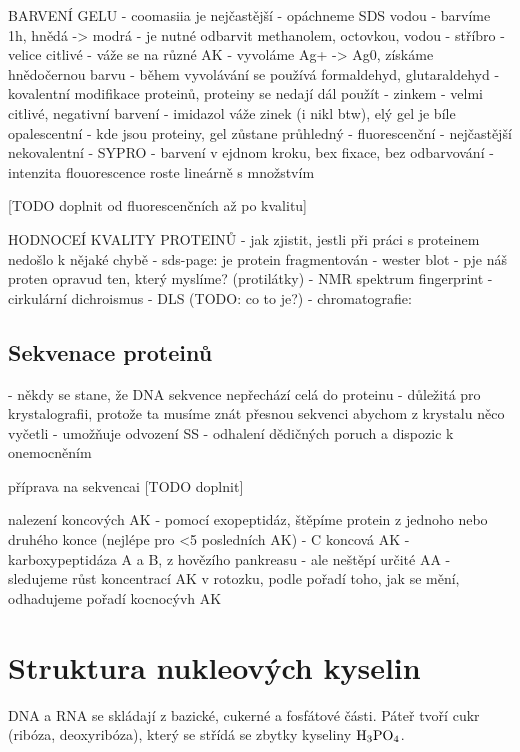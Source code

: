 \documentclass[DIV=8]{scrreprt}
\begin{document}
BARVENÍ GELU
- coomasiia je nejčastější
    - opáchneme SDS vodou
    - barvíme 1h, hnědá -> modrá
    - je nutné odbarvit methanolem, octovkou, vodou
- stříbro
    - velice citlivé
    - váže se na různé AK
    - vyvoláme Ag+ -> Ag0, získáme hnědočernou barvu
    - během vyvolávání se používá formaldehyd, glutaraldehyd
        - kovalentní modifikace proteinů, proteiny se nedají dál použít
- zinkem
    - velmi citlivé, negativní barvení
    - imidazol váže zinek (i nikl btw), elý gel je bíle opalescentní
    - kde jsou proteiny, gel zůstane průhledný
- fluorescenční
    - nejčastější nekovalentní
    - SYPRO
        - barvení v ejdnom kroku, bex fixace, bez odbarvování
        - intenzita flouorescence roste lineárně s množstvím

[TODO doplnit od fluorescenčních až po kvalitu]

HODNOCEÍ KVALITY PROTEINŮ
- jak zjistit, jestli při práci s proteinem nedošlo k nějaké chybě
- sds-page: je protein fragmentován
- wester blot - pje náš proten opravud ten, který myslíme? (protilátky)
- NMR spektrum fingerprint
- cirkulární dichroismus
- DLS (TODO: co to je?)
- chromatografie:

\section{Sekvenace proteinů} \label{Sekvenace proteinů}

- někdy se stane, že DNA sekvence nepřechází celá do proteinu
- důležitá pro krystalografii, protože ta musíme znát přesnou sekvenci abychom z krystalu něco vyčetli
- umožňuje odvození SS
- odhalení dědičných poruch a dispozic k onemocněním


příprava na sekvencai
[TODO doplnit]

nalezení koncových AK
- pomocí exopeptidáz, štěpíme protein z jednoho nebo druhého konce (nejlépe pro <5 posledních AK)
- C koncová AK
    - karboxypeptidáza A a B, z hovězího pankreasu
    - ale neštěpí určité AA
- sledujeme růst koncentrací AK v rotozku, podle pořadí toho, jak se mění, odhadujeme pořadí kocnocývh AK


\chapter{Struktura nukleových kyselin} \label{Struktura nukleových kyselin}


DNA a RNA se skládají z bazické, cukerné a fosfátové části. Páteř tvoří cukr (ribóza, deoxyribóza), který se střídá se zbytky kyseliny \(\ce{H3PO4}\).
\end{document}
